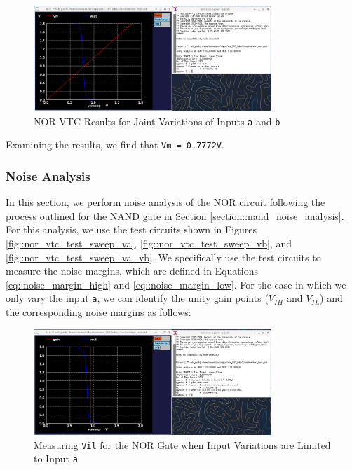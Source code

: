 \documentclass[fleqn]{article}
\begin{document}
	\begin{figure}[H]
		\centerline{\includegraphics[width=0.8\textwidth]{nor_vtc_sweep_va_vb.png}}
		\caption{NOR VTC Results for Joint Variations of Inputs \texttt{a} and \texttt{b}}
		\label{fig::nor_vtc_sweep_va_vb}
	\end{figure}
	
	Examining the results, we find that \texttt{Vm = 0.7772V}.
	
	\subsubsection{Noise Analysis}
	
	In this section, we perform noise analysis of the NOR circuit following the process outlined for the NAND gate in Section \ref{section::nand_noise_analysis}. For this analysis, we use the test circuits shown in Figures \ref{fig::nor_vtc_test_sweep_va}, \ref{fig::nor_vtc_test_sweep_vb}, and \ref{fig::nor_vtc_test_sweep_va_vb}. We specifically use the test circuits to measure the noise margins, which are defined in Equations \ref{eq::noise_margin_high} and \ref{eq::noise_margin_low}. For the case in which we only vary the input \texttt{a}, we can identify the unity gain points ($V_{IH}$ and $V_{IL}$) and the corresponding noise margins as follows:
	
	\begin{figure}[H]
		\centerline{\includegraphics[width=0.8\textwidth]{nor_noise_analysis_sweep_va.png}}
		\caption{Measuring \texttt{Vil} for the NOR Gate when Input Variations are Limited to Input \texttt{a}}
		\label{fig::nor_noise_analysis_sweep_va}
	\end{figure}
	
\end{document}
